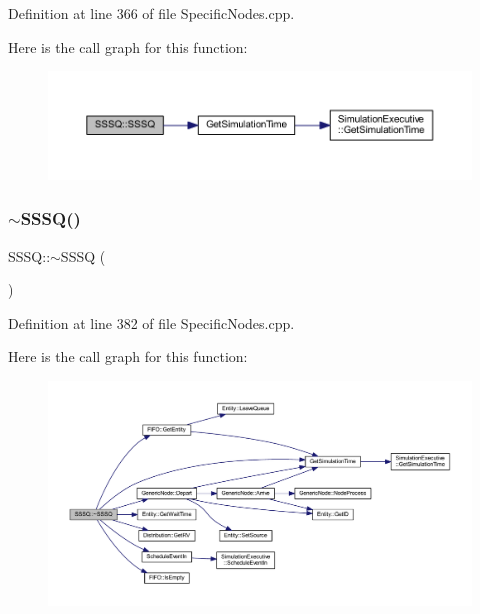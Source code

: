 Definition at line 366 of file Specific\+Nodes.\+cpp.

Here is the call graph for this function\+:
\nopagebreak
\begin{figure}[H]
\begin{center}
\leavevmode
\includegraphics[width=350pt]{class_s_s_s_q_ab654407f52271f87971b0642dd61a543_cgraph}
\end{center}
\end{figure}
\mbox{\label{class_s_s_s_q_a6316b4f5b481609f244022cd83ef67bb}} 
\subsubsection{\texorpdfstring{$\sim$\+S\+S\+S\+Q()}{~SSSQ()}}
{\footnotesize\ttfamily S\+S\+S\+Q\+::$\sim$\+S\+S\+SQ (\begin{DoxyParamCaption}{ }\end{DoxyParamCaption})}



Definition at line 382 of file Specific\+Nodes.\+cpp.

Here is the call graph for this function\+:
\nopagebreak
\begin{figure}[H]
\begin{center}
\leavevmode
\includegraphics[width=350pt]{class_s_s_s_q_a6316b4f5b481609f244022cd83ef67bb_cgraph}
\end{center}
\end{figure}


